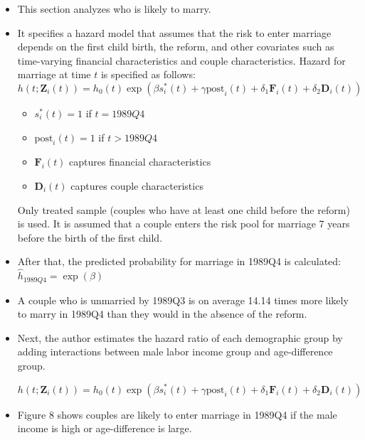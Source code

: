 \documentclass[a4paper, 12pt]{article}
\renewcommand{\vec}[1]{\mathbf{#1}}
\begin{document}
\begin{itemize}
\item This section analyzes who is likely to marry.
\item It specifies a hazard model that assumes that the risk to enter marriage depends on the first child birth, the reform, and other covariates such as time-varying financial characteristics and couple characteristics. Hazard for marriage at time $t$ is specified as follows:
\begin{equation}
h(t;\vec{Z}_i(t))=h_0(t)\exp(\beta s_i^*(t)+\gamma\text{post}_i(t)+\delta_1 \vec{F}_i(t)+\delta_2\vec{D}_i(t))
\end{equation}

\begin{itemize}
\item $s_i^*(t)=1$ if $t=1989Q4$
\item $\text{post}_i(t)=1$ if $t>1989Q4$
\item $\vec{F}_i(t)$ captures financial characteristics
\item $\vec{D}_i(t)$ captures couple characteristics
\end{itemize}

Only treated sample (couples who have at least one child before the reform) is used. It is assumed that a couple enters the risk pool for marriage 7 years before the birth of the first child.

\item After that, the predicted probability for marriage in 1989Q4 is calculated: $\hat{h}_{1989Q4}=\exp(\beta)$

\item A couple who is unmarried by 1989Q3 is on average 14.14 times more likely to marry in 1989Q4 than they would in the absence of the reform.

\item Next, the author estimates the hazard ratio of each demographic group by adding interactions between male labor income group and age-difference group.

\begin{equation}
h(t;\vec{Z}_i(t))=h_0(t)\exp(\beta s_i^*(t)+\gamma\text{post}_i(t)+\delta_1 \vec{F}_i(t)+\delta_2\vec{D}_i(t))
\end{equation}

\item Figure 8 shows couples are likely to enter marriage in 1989Q4 if the male income is high or age-difference is large.
\end{itemize}
\end{document}
